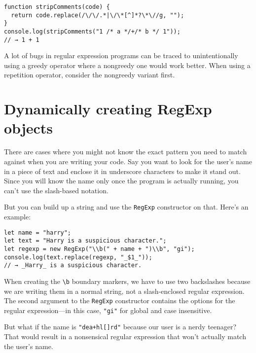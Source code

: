\begin{lstlisting}
function stripComments(code) {
  return code.replace(/\/\/.*|\/\*[^]*?\*\//g, "");
}
console.log(stripComments("1 /* a */+/* b */ 1"));
// → 1 + 1
\end{lstlisting}
\noindent

A lot of bugs in regular expression programs can be traced to unintentionally using a greedy operator where a nongreedy one would work better. When using a repetition operator, consider the nongreedy variant first.

\section{Dynamically creating RegExp objects}

There are cases where you might not know the exact pattern you need to match against when you are writing your code. Say you want to look for the user's name in a piece of text and enclose it in underscore characters to make it stand out. Since you will know the name only once the program is actually running, you can't use the slash-based notation.

But you can build up a string and use the \lstinline`RegExp` constructor on that. Here's an example:

\begin{lstlisting}
let name = "harry";
let text = "Harry is a suspicious character.";
let regexp = new RegExp("\\b(" + name + ")\\b", "gi");
console.log(text.replace(regexp, "_$1_"));
// → _Harry_ is a suspicious character.
\end{lstlisting}
\noindent{}

When creating the \lstinline`\b` boundary markers, we have to use two backslashes because we are writing them in a normal string, not a slash-enclosed regular expression. The second argument to the \lstinline`RegExp` constructor contains the options for the regular expression—in this case, \lstinline`"gi"` for global and case insensitive.

But what if the name is \lstinline`"dea+hl[]rd"` because our user is a nerdy teenager? That would result in a nonsensical regular expression that won't actually match the user's name.

